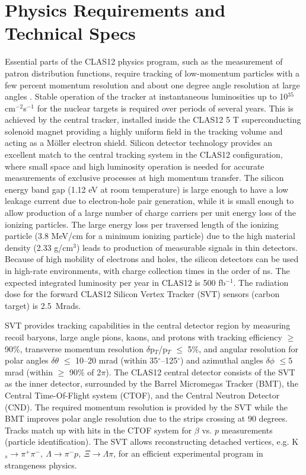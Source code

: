 \section{Physics Requirements and Technical Specs}
Essential parts of the CLAS12 physics program, such as the measurement of patron distribution functions, require tracking of low-momentum  particles with a few percent momentum resolution and about one degree angle resolution at large angles \cite{TDR12}. Stable operation of the tracker at instantaneous luminosities up to 10$^{35}$cm$^{-2}$s$^{-1}$ for the nuclear targets is required over periods of several years. This is achieved by the central tracker, installed inside the CLAS12 5 T superconducting solenoid magnet providing a highly uniform field in the tracking volume and acting as a M\"oller electron shield. Silicon detector technology provides an excellent match to the central tracking system in the CLAS12 configuration, where small space and high luminosity operation is needed for accurate measurements of exclusive processes at high momentum transfer. The silicon energy band gap (1.12 eV at room temperature) is large enough to have a low leakage current due to electron-hole pair generation, while it is small enough to allow production of a large number of charge carriers per unit energy loss of the ionizing particles. The large energy loss per traversed length of the ionizing particle (3.8 MeV/cm for a minimum ionizing particle) due to the high material density (2.33 g/cm$^3$) leads to production of  measurable signals in thin detectors. Because of high mobility of electrons and holes, the silicon detectors can be used in high-rate environments, with charge collection times in the order of ns. The expected integrated luminosity per year in CLAS12 is 500 fb$^{-1}$. The radiation dose for the forward CLAS12 Silicon Vertex Tracker (SVT) sensors (carbon target) is 2.5~Mrads.

SVT provides tracking capabilities in the central detector region by measuring recoil baryons, large angle pions,  kaons, and protons with tracking efficiency $\ge$ 90$\%$, transverse momentum resolution $\delta$p$_{T}$/p$_{T}$ $\le$ 5$\%$, and angular resolution for polar angles $\delta$$\theta$ $\le$ 10--20 mrad (within 35$^\circ$--125$^\circ$) and azimuthal angles $\delta$$\phi$ $\le5$ mrad (within $\ge$ 90$\%$ of 2$\pi$). The CLAS12 central detector consists of the SVT as the inner detector, surrounded by the Barrel Micromegas Tracker (BMT), the Central Time-Of-Flight system (CTOF), and the Central Neutron Detector (CND). The required momentum resolution is provided by the SVT while the BMT improves polar angle resolution due to the strips crossing at $ 90$ degrees. Tracks match up with hits in the CTOF system for $\beta$ vs. $p$ measurements (particle identification). The SVT allows reconstructing detached vertices, e.g. K$_{s}\!\to\!\pi^{+}\pi^{-},~\Lambda\!\to\!\pi^{-}p,~\Xi\!\to\!\Lambda\pi$, for an efficient experimental program in strangeness physics.  

